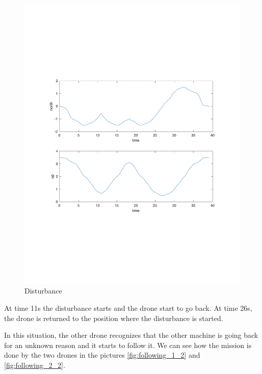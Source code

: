 \begin{figure}[h]
\centering
\includegraphics[width=1.0\textwidth]{chapters/chapter-04/figures/pos_2.pdf}
\caption{Disturbance}
\label{fig:disturbance_2}
\end{figure}

At time 11s the disturbance starts and the drone start to go back. At time 26s,
the drone is returned to the position where the disturbance is started.

In this situation, the other drone recognizes that the other machine is going back
for an unknown reason and it starts to follow it. We can see how the mission is done
by the two drones in the pictures \ref{fig:following_1_2} and \ref{fig:following_2_2}.


